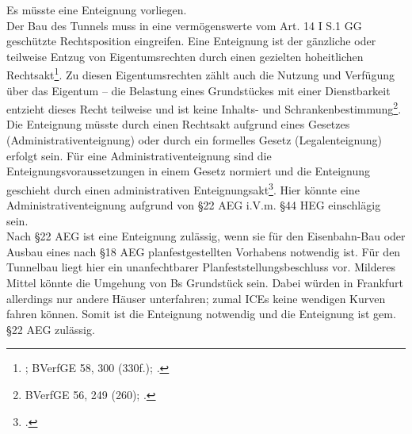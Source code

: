 \documentclass[widefront, ngerman]{jura}
\begin{document}
Es müsste eine Enteignung vorliegen.\\
Der Bau des Tunnels muss in eine vermögenswerte vom Art. 14 I S.1 GG geschützte Rechtsposition eingreifen. Eine Enteignung ist der gänzliche oder teilweise Entzug von Eigentumsrechten durch einen gezielten hoheitlichen Rechtsakt\footnote{\cite[§16 Rn 78ff.]{DetterbeckStaatshaftung}; BVerfGE 58, 300 (330f.); \cite[Rn 1118]{detterbeckVerwR}.}. Zu diesen Eigentumsrechten zählt auch die Nutzung und Verfügung über das Eigentum -- die Belastung eines Grundstückes mit einer Dienstbarkeit entzieht dieses Recht teilweise und ist keine Inhalts- und Schrankenbestimmung\footnote{BVerfGE 56, 249 (260); \cite[Rn 1113]{detterbeckVerwR}.}.\\
Die Enteignung müsste durch einen Rechtsakt aufgrund eines Gesetzes (Administrativenteignung) oder durch ein formelles Gesetz (Legalenteignung) erfolgt sein. Für eine Administrativenteignung sind die Enteignungsvoraussetzungen in einem Gesetz normiert und die Enteignung geschieht durch einen administrativen Enteignungsakt\footcite[S. 180]{Ossenbuehl}. Hier könnte eine Administrativenteignung aufgrund von §22 AEG i.V.m. §44 HEG einschlägig sein.\\
Nach §22 AEG ist eine Enteignung zulässig, wenn sie für den Eisenbahn-Bau oder Ausbau eines nach §18 AEG planfestgestellten Vorhabens notwendig ist. Für den Tunnelbau liegt hier ein unanfechtbarer Planfeststellungsbeschluss vor. Milderes Mittel könnte die Umgehung von Bs Grundstück sein. Dabei würden in Frankfurt allerdings nur andere Häuser unterfahren; zumal ICEs keine wendigen Kurven fahren können. Somit ist die Enteignung notwendig und die Enteignung ist gem. §22 AEG zulässig.\\
\end{document}
